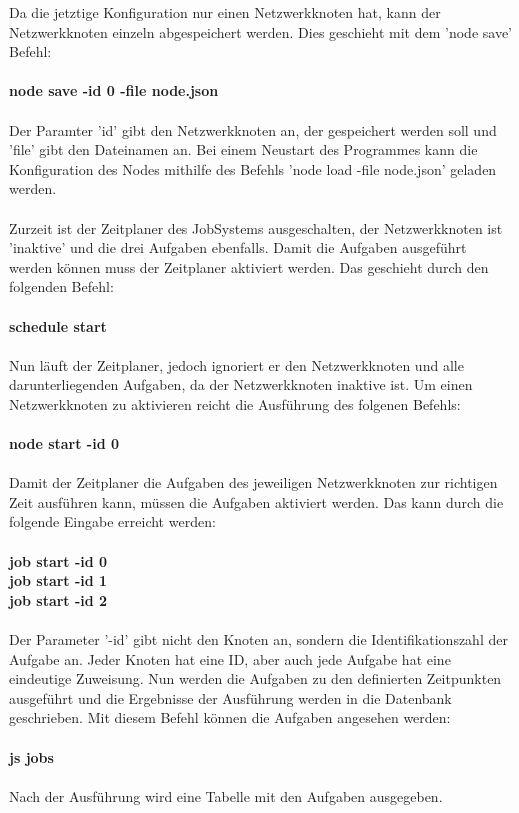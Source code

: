 \documentclass[12pt,a4paper]{report}
\begin{document}
Da die jetztige Konfiguration nur einen Netzwerkknoten hat, kann der Netzwerkknoten einzeln abgespeichert werden. Dies geschieht mit dem 'node save' Befehl:\\\\
\textbf{node save -id 0 -file node.json}\\\\
Der Paramter 'id' gibt den Netzwerkknoten an, der gespeichert werden soll und 'file' gibt den Dateinamen an. Bei einem Neustart des Programmes kann die Konfiguration des Nodes mithilfe des Befehls 'node load -file node.json' geladen werden.\\\\
Zurzeit ist der Zeitplaner des JobSystems ausgeschalten, der Netzwerkknoten ist 'inaktive' und die drei Aufgaben ebenfalls. Damit die Aufgaben ausgeführt werden können muss der Zeitplaner aktiviert werden. Das geschieht durch den folgenden Befehl:\\\\
\textbf{schedule start}\\\\
Nun läuft der Zeitplaner, jedoch ignoriert er den Netzwerkknoten und alle darunterliegenden Aufgaben, da der Netzwerkknoten inaktive ist. Um einen Netzwerkknoten zu aktivieren reicht die Ausführung des folgenen Befehls:\\\\
\textbf{node start -id 0}\\\\
Damit der Zeitplaner die Aufgaben des jeweiligen Netzwerkknoten zur richtigen Zeit ausführen kann, müssen die Aufgaben aktiviert werden. Das kann durch die folgende Eingabe erreicht werden:\\\\
\textbf{job start -id 0}\\
\textbf{job start -id 1}\\
\textbf{job start -id 2}\\\\
Der Parameter '-id' gibt nicht den Knoten an, sondern die Identifikationszahl der Aufgabe an. Jeder Knoten hat eine ID, aber auch jede Aufgabe hat eine eindeutige Zuweisung. Nun werden die Aufgaben zu den definierten Zeitpunkten ausgeführt und die Ergebnisse der Ausführung werden in die Datenbank geschrieben. Mit diesem Befehl können die Aufgaben angesehen werden: \\\\
\textbf{js jobs}\\\\
Nach der Ausführung wird eine Tabelle mit den Aufgaben ausgegeben.
\end{document}
